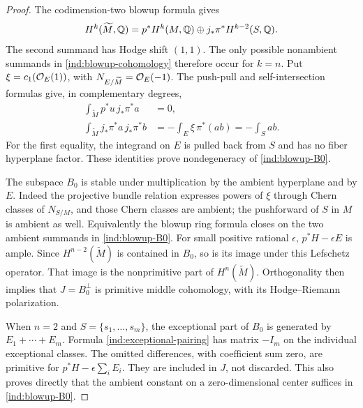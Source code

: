 \begin{proof}
The codimension-two blowup formula gives
\begin{equation}
\label{ind:blowup-cohomology}
 H^k(\widetilde M,\mathbb Q)
  =p^*H^k(M,\mathbb Q)\oplus j_*\pi^*H^{k-2}(S,\mathbb Q).
\end{equation}
The second summand has Hodge shift $(1,1)$. The only possible
nonambient summands in \eqref{ind:blowup-cohomology} therefore occur
for $k=n$. Put $\xi=c_1(\mathcal O_E(1))$, with
$N_{E/\widetilde M}=\mathcal O_E(-1)$. The push-pull and self-intersection
formulas give, in complementary degrees,
\begin{align}
 \int_{\widetilde M}p^*u\,j_*\pi^*a&=0,\label{ind:orthogonal}\\
 \int_{\widetilde M}j_*\pi^*a\,j_*\pi^*b
       &=-\int_E\xi\,\pi^*(ab)=-\int_Sab.
       \label{ind:exceptional-pairing}
\end{align}
For the first equality, the integrand on $E$ is pulled back from $S$
and has no fiber hyperplane factor. These identities prove
nondegeneracy of \eqref{ind:blowup-B0}.

The subspace $B_0$ is stable under multiplication by the ambient
hyperplane and by $E$. Indeed the projective bundle relation expresses
powers of $\xi$ through Chern classes of $N_{S/M}$, and those Chern
classes are ambient; the pushforward of $S$ in $M$ is ambient as well.
Equivalently the blowup ring formula closes on the two ambient
summands in \eqref{ind:blowup-B0}. For small positive rational
$\epsilon$, $p^*H-\epsilon E$ is ample. Since $H^{n-2}(\widetilde M)$
is contained in $B_0$, so is its image under this Lefschetz operator.
That image is the nonprimitive part of $H^n(\widetilde M)$.
Orthogonality then implies that $J=B_0^\perp$ is primitive middle
cohomology, with its Hodge--Riemann polarization.

When $n=2$ and $S=\{s_1,\ldots,s_m\}$, the exceptional part of
$B_0$ is generated by $E_1+\cdots+E_m$. Formula
\eqref{ind:exceptional-pairing} has matrix $-I_m$ on the individual
exceptional classes. The omitted differences, with coefficient sum
zero, are primitive for $p^*H-\epsilon\sum_iE_i$. They are included
in $J$, not discarded. This also proves directly that the ambient
constant on a zero-dimensional center suffices in
\eqref{ind:blowup-B0}.


\end{proof}
